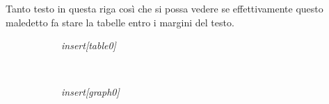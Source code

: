 \documentclass[a4paper]{article}
\newcommand{\SRE}[1]{\textit{insert[#1]}}
\begin{document}
Tanto testo in questa riga così che si possa vedere se effettivamente questo maledetto fa stare la tabelle entro i margini del testo.

\tabulinesep=1.5mm

\begin{figure}[h!]
  \begin{subfigure}[cm]{0.5\linewidth}
    \SRE{table0}
  \end{subfigure}
  ~
  \begin{subfigure}[cm]{0.5\linewidth}
    \SRE{graph0}
  \end{subfigure}
\end{figure}
\end{document}

